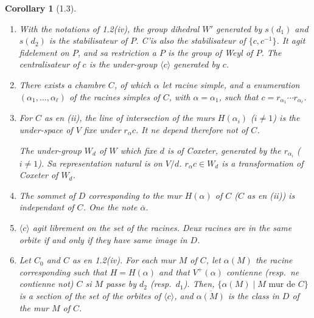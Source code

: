 \documentclass[11pt,a4paper]{article}
\theoremstyle{plain}
\newtheorem{corollary}[theorem]{Corollary}
\theoremstyle{definition}
\begin{document}
\begin{corollary}[1.3]
\leavevmode
\begin{enumerate}[label=\textup{(\roman*)}]
\item With the notations of \textup{1.2(iv)}, the group dihedral $W'$ generated by $s(d_1)$ and $s(d_2)$ is the stabilisateur of $P$. C'is also the stabilisateur of $\{c, c^{-1}\}$. It agit fidelement on $P$, and sa restriction a $P$ is the group of Weyl of $P$. The centralisateur of $c$ is the under-group $\langle c \rangle$ generated by $c$.

\item There exists a chambre $C$, of which $\alpha$ let racine simple, and a enumeration $(\alpha_1, \ldots, \alpha_\ell)$ of the racines simples of $C$, with $\alpha = \alpha_1$, such that $c = r_{\alpha_1} \cdots r_{\alpha_\ell}$.

\item For $C$ as en \textup{(ii)}, the line of intersection of the murs $H(\alpha_i)$ ($i \neq 1$) is the under-space of $V$ fixe under $r_\alpha c$. It ne depend therefore not of $C$.

The under-group $W_d$ of $W$ which fixe $d$ is of Coxeter, generated by the $r_{\alpha_i}$ ($i \neq 1$). Sa representation natural is on $V/d$. $r_\alpha c \in W_d$ is a transformation of Coxeter of $W_d$.

\item The sommet of $D$ corresponding to the mur $H(\alpha)$ of $C$ ($C$ as en \textup{(ii)}) is independant of $C$. One the note $\overline{\alpha}$.

\item $\langle c \rangle$ agit librement on the set of the racines. Deux racines are in the same orbite if and only if they have same image in $D$.

\item Let $C_0$ and $C$ as en \textup{1.2(iv)}. For each mur $M$ of $C$, let $\alpha(M)$ the racine corresponding such that $H = H(\alpha)$ and that $V^{+}(\alpha)$ contienne (resp.\ ne contienne not) $C$ si $M$ passe by $d_2$ (resp.\ $d_1$). Then, $\{\alpha(M) \mid M \text{ mur de } C\}$ is a section of the set of the orbites of $\langle c \rangle$, and $\overline{\alpha(M)}$ is the class in $D$ of the mur $M$ of $C$.
\end{enumerate}
\end{corollary}
\end{document}
